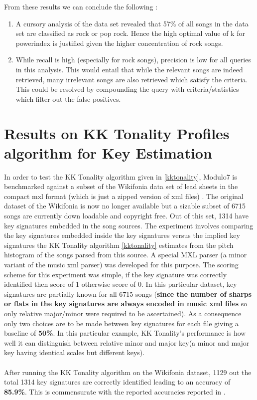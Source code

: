 From these results we can conclude the following : 

\begin{enumerate}
\item A cursory analysis of the data set revealed that 57\% of all songs in the data set are classified as rock or pop rock. Hence the high optimal value of k for powerindex is justified given the higher concentration of rock songs. 
\item While recall is high (especially for rock songs), precision is low for all queries in this analysis. This would entail that while the relevant songs are indeed retrieved, many irrelevant songs are also retrieved which satisfy the criteria. This could be resolved by compounding the query with criteria/statistics which filter out the false positives. 
\end{enumerate}

\section{Results on KK Tonality Profiles algorithm for Key Estimation} \label{kktonalexpt}

\noindent In order to test the KK Tonality algorithm given in \ref{kktonality}, Modulo7 is benchmarked against a subset of the Wikifonia data set of lead sheets in the compact mxl format (which is just a zipped version of xml files) \cite{WikifoniaDataset}. The original dataset of the Wikifonia is now no longer available but a sizable subset of 6715 songs are currently down loadable and copyright free. Out of this set, 1314 have key signatures embedded in the song sources. The experiment involves comparing the key signatures embedded inside the key signatures versus the implied key signatures the KK Tonality algorithm \ref{kktonality} estimates from the pitch histogram of the songs parsed from this source. A special MXL parser (a minor variant of the music xml parser) was developed for this purpose. The scoring scheme for this experiment was simple, if the key signature was correctly identified then score of 1 otherwise score of 0. In this particular dataset, key signatures are partially known for all 6715 songs (\textbf{since the number of sharps or flats in the key signatures are always encoded in music xml files} so only relative major/minor were required to be ascertained). As a consequence only two choices are to be made between key signatures for each file giving a baseline of \textbf{50\%}. In this particular example, KK Tonality's performance is how well it can distinguish between relative minor and major key(a minor and major key having identical scales but different keys). \\\\
After running the KK Tonality algorithm on the Wikifonia dataset, 1129 out the total 1314 key signatures are correctly identified leading to an accuracy of \textbf{85.9\%}. This is commensurate with the reported accuracies reported in \cite{kkTonalityKeyFinding}. 


